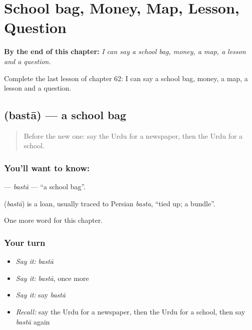 
\chapter{School bag, Money, Map, Lesson, Question}
\label{ch:ur-school-bag-money-map-lesson-question}

\begin{chapteropening}
\textbf{By the end of this chapter:} \emph{I can say a school bag, money, a map, a lesson and a question.}

Complete the last lesson of chapter 62: I can say a school bag, money, a map, a lesson and a question.
\end{chapteropening}

\section[\texorpdfstring{\ur{بستہ} (bastā)}{بستہ (bastā)}]{ (bastā) — a school bag}

\label{lesson:UR-C62-basta}



\begin{quote}
Before the new one: say the Urdu for a newspaper, then the Urdu for a school.
\end{quote}

\subsection*{You'll want to know: }
\textbf{} — \emph{bastā} — \textquotedblleft{}a school bag\textquotedblright{}.

\begin{cousinweb}
\textbf{} (\emph{bastā}) is a loan, usually traced to Persian \emph{basta}, \textquotedblleft{}tied up; a bundle\textquotedblright{}.
\end{cousinweb}

\begin{grammarlens}[title={What you've built}]
One more word for this chapter.
\end{grammarlens}

\subsection*{Your turn}
\begin{itemize}
\raggedright
  \item \emph{Say it:} \emph{bastā}
  \item \emph{Say it:} \emph{bastā}, once more
  \item \emph{Say it:} say \emph{bastā}
  \item \emph{Recall:} say the Urdu for a newspaper, then the Urdu for a school, then say \emph{bastā} again
\end{itemize}

